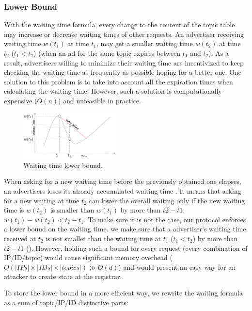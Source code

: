 \subsubsection{Lower Bound}
With the waiting time formula, every change to the content of the topic table may increase or decrease waiting times of other requests. An advertiser receiving waiting time $w(t_1)$ at time $t_1$, may get a smaller waiting time $w(t_2)$ at time $t_2$ ($t_1 < t_2$) (\eg when an ad for the same topic expires between $t_1$ and $t_2$). As a result, advertisers willing to minimize their waiting time are incentivized to keep checking the waiting time as frequently as possible hoping for a better one.
One solution to this problem is to take into account all the expiration times when calculating the waiting time. However, such a solution is computationally expensive (\eg $O(n)$) and unfeasible in practice.

\begin{figure}
    \includegraphics[width=0.45\textwidth]{img/lower_bound.png}
    \caption{Waiting time lower bound.}
    \label{fig:lower_bound}
\end{figure}

When asking for a new waiting time before the previously obtained one elapses, an advertisers loses its already accumulated waiting time . It means that asking for a new waiting at time $t_2$ can lower the overall waiting only if the new waiting time is $w(t_2)$ is smaller than $w(t_1)$ by more than $t2 - t1$: $w(t_1) - w(t_2) < t_2 - t_1$.
To make sure it is not the case, our protocol enforces a lower bound on the waiting time. \Ie we make sure that a advertiser's waiting time received at $t_2$ is not smaller than the waiting time at $t_1$ ($t_1 < t_2$) by more than $t2 - t1$ (). However, holding such a bound for every request (\ie every combination of IP/ID/topic) would cause significant memory overhead ($O(|IPs|\times|IDs|\times|topics|)  \gg O(d)$) and would present an easy way for an attacker to create state at the registrar. 

To store the lower bound in a more efficient way, we rewrite the waiting formula as a sum of topic/IP/ID distinctive parts:


